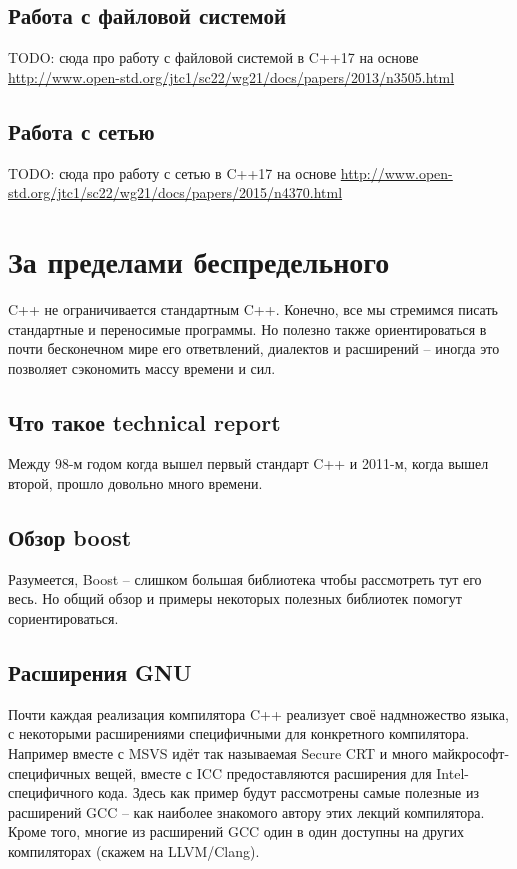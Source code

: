 \documentclass[a4paper,12pt,oneside]{article}
\begin{document}
\pagebreak
\subsection{Работа с файловой системой}\label{NewFS}

TODO: сюда про работу с файловой системой в C++17 на основе \url{http://www.open-std.org/jtc1/sc22/wg21/docs/papers/2013/n3505.html}

\pagebreak
\subsection{Работа с сетью}\label{NewASIO}

TODO: сюда про работу с сетью в C++17 на основе \url{http://www.open-std.org/jtc1/sc22/wg21/docs/papers/2015/n4370.html}

\pagebreak
\section{За пределами беспредельного}

C++ не ограничивается стандартным C++. Конечно, все мы стремимся писать стандартные и переносимые программы. Но полезно также ориентироваться в почти бесконечном мире его ответвлений, диалектов и расширений -- иногда это позволяет сэкономить массу времени и сил.

\subsection{Что такое technical report}

Между 98-м годом когда вышел первый стандарт C++ и 2011-м, когда вышел второй, прошло довольно много времени.

\subsection{Обзор boost}

Разумеется, Boost -- слишком большая библиотека чтобы рассмотреть тут его весь. Но общий обзор и примеры некоторых полезных библиотек помогут сориентироваться.

\subsection{Расширения GNU}\label{GNUExt}

Почти каждая реализация компилятора C++ реализует своё надмножество языка, с некоторыми расширениями специфичными для конкретного компилятора. Например вместе с MSVS идёт так называемая Secure CRT и много майкрософт-специфичных вещей, вместе с ICC предоставляются расширения для Intel-специфичного кода. Здесь как пример будут рассмотрены самые полезные из расширений GCC -- как наиболее знакомого автору этих лекций компилятора. Кроме того, многие из расширений GCC один в один доступны на других компиляторах (скажем на LLVM/Clang).
\end{document}
